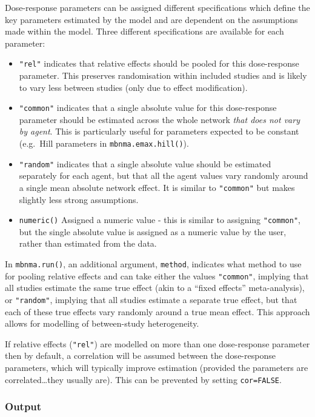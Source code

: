 \documentclass[]{article}
\providecommand{\tightlist}{%
  \setlength{\itemsep}{0pt}\setlength{\parskip}{0pt}}
\begin{document}
Dose-response parameters can be assigned different specifications which
define the key parameters estimated by the model and are dependent on
the assumptions made within the model. Three different specifications
are available for each parameter:

\begin{itemize}
\tightlist
\item
  \texttt{"rel"} indicates that relative effects should be pooled for
  this dose-response parameter. This preserves randomisation within
  included studies and is likely to vary less between studies (only due
  to effect modification).
\item
  \texttt{"common"} indicates that a single absolute value for this
  dose-response parameter should be estimated across the whole network
  \emph{that does not vary by agent}. This is particularly useful for
  parameters expected to be constant (e.g.~Hill parameters in
  \texttt{mbnma.emax.hill()}).
\item
  \texttt{"random"} indicates that a single absolute value should be
  estimated separately for each agent, but that all the agent values
  vary randomly around a single mean absolute network effect. It is
  similar to \texttt{"common"} but makes slightly less strong
  assumptions.
\item
  \texttt{numeric()} Assigned a numeric value - this is similar to
  assigning \texttt{"common"}, but the single absolute value is assigned
  as a numeric value by the user, rather than estimated from the data.
\end{itemize}

In \texttt{mbnma.run()}, an additional argument, \texttt{method},
indicates what method to use for pooling relative effects and can take
either the values \texttt{"common"}, implying that all studies estimate
the same true effect (akin to a ``fixed effects'' meta-analysis), or
\texttt{"random"}, implying that all studies estimate a separate true
effect, but that each of these true effects vary randomly around a true
mean effect. This approach allows for modelling of between-study
heterogeneity.

If relative effects (\texttt{"rel"}) are modelled on more than one
dose-response parameter then by default, a correlation will be assumed
between the dose-response parameters, which will typically improve
estimation (provided the parameters are correlated\ldots{}they usually
are). This can be prevented by setting \texttt{cor=FALSE}.

\hypertarget{output}{%
\subsubsection{Output}\label{output}}
\end{document}
